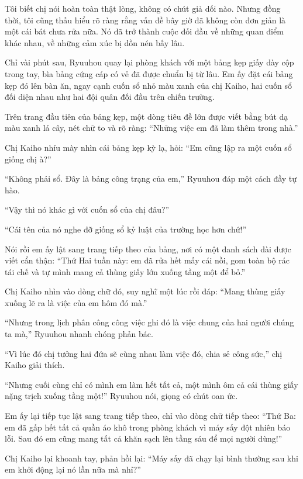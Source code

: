 \documentclass[../main.tex]{subfiles}
\begin{document}
Tôi biết chị nói hoàn toàn thật lòng, không có chút giả dối nào. Nhưng đồng thời, tôi cũng thấu hiểu rõ ràng rằng vấn đề bây giờ đã không còn đơn giản là một cái bát chưa rửa nữa. Nó đã trở thành cuộc đối đầu về những quan điểm khác nhau, về những cảm xúc bị dồn nén bấy lâu.

\ct

Chỉ vài phút sau, Ryuuhou quay lại phòng khách với một bảng kẹp giấy dày cộp trong tay, bìa bảng cứng cáp có vẻ đã được chuẩn bị từ lâu. Em ấy đặt cái bảng kẹp đó lên bàn ăn, ngay cạnh cuốn sổ nhỏ màu xanh của chị Kaiho, hai cuốn sổ đối diện nhau như hai đội quân đối đầu trên chiến trường.

Trên trang đầu tiên của bảng kẹp, một dòng tiêu đề lớn được viết bằng bút dạ màu xanh lá cây, nét chữ to và rõ ràng: ``Những việc em đã làm thêm trong nhà.''

Chị Kaiho nhíu mày nhìn cái bảng kẹp kỳ lạ, hỏi: ``Em cũng lập ra một cuốn sổ giống chị à?''

``Không phải sổ. Đây là bảng công trạng của em,'' Ryuuhou đáp một cách đầy tự hào.

``Vậy thì nó khác gì với cuốn sổ của chị đâu?''

``Cái tên của nó nghe đỡ giống sổ kỷ luật của trường học hơn chứ!''

Nói rồi em ấy lật sang trang tiếp theo của bảng, nơi có một danh sách dài được viết cẩn thận: ``Thứ Hai tuần này: em đã rửa hết mấy cái nồi, gom toàn bộ rác tái chế và tự mình mang cả thùng giấy lớn xuống tầng một để bỏ.''

Chị Kaiho nhìn vào dòng chữ đó, suy nghĩ một lúc rồi đáp: ``Mang thùng giấy xuống lẽ ra là việc của em hôm đó mà.''

``Nhưng trong lịch phân công công việc ghi đó là việc chung của hai người chúng ta mà,'' Ryuuhou nhanh chóng phản bác.

``Vì lúc đó chị tưởng hai đứa sẽ cùng nhau làm việc đó, chia sẻ công sức,'' chị Kaiho giải thích.

``Nhưng cuối cùng chỉ có mình em làm hết tất cả, một mình ôm cả cái thùng giấy nặng trịch xuống tầng một!'' Ryuuhou nói, giọng có chút oan ức.

Em ấy lại tiếp tục lật sang trang tiếp theo, chỉ vào dòng chữ tiếp theo: ``Thứ Ba: em đã gấp hết tất cả quần áo khô trong phòng khách vì máy sấy đột nhiên báo lỗi. Sau đó em cũng mang tất cả khăn sạch lên tầng sáu để mọi người dùng!''

Chị Kaiho lại khoanh tay, phản hồi lại: ``Máy sấy đã chạy lại bình thường sau khi em khởi động lại nó lần nữa mà nhỉ?''
\end{document}
